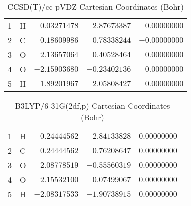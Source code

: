 \documentclass[10pt,oneside]{article}
\begin{document}
\begin{table}[h!]
\centering
\caption{CCSD(T)/cc-pVDZ Cartesian Coordinates (Bohr)}
\begin{tabular}{llrrr}
1  & H  & $ 0.03271478$ & $ 2.87673387$ & $-0.00000000$ \\
2  & C  & $ 0.18609986$ & $ 0.78338244$ & $-0.00000000$ \\
3  & O  & $ 2.13657064$ & $-0.40528464$ & $-0.00000000$ \\
4  & O  & $-2.15903680$ & $-0.23402136$ & $ 0.00000000$ \\
5  & H  & $-1.89201967$ & $-2.05808427$ & $ 0.00000000$ \\
\end{tabular}
\end{table}

\begin{table}[h!]
\centering
\caption{B3LYP/6-31G(2df,p) Cartesian Coordinates (Bohr)}
\begin{tabular}{llrrr}
1  & H  & $ 0.24444562$ & $ 2.84133828$ & $ 0.00000000$ \\
2  & C  & $ 0.24444562$ & $ 0.76208647$ & $ 0.00000000$ \\
3  & O  & $ 2.08778519$ & $-0.55560319$ & $ 0.00000000$ \\
4  & O  & $-2.15532100$ & $-0.07499067$ & $ 0.00000000$ \\
5  & H  & $-2.08317533$ & $-1.90738915$ & $ 0.00000000$ \\
\end{tabular}
\end{table}

\clearpage
\end{document}
